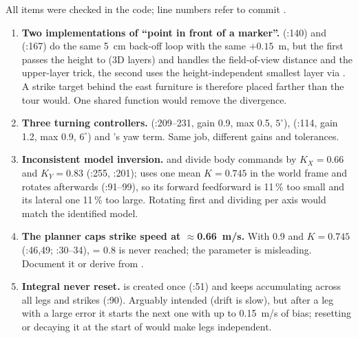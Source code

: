 \begin{review}
All items were checked in the code; line numbers refer to commit .
\begin{enumerate}[leftmargin=*]
  \item \textbf{Two implementations of ``point in front of a marker''.} 
        (:140) and  (:167) do the same
        5~cm back-off loop with the same $+0.15$~m, but the first passes the height to  (3D
        layers) and handles the field-of-view distance and the upper-layer trick, the second uses the
        height-independent smallest layer via . A strike target behind the east furniture is
        therefore placed farther than the tour would. One shared function would remove the divergence.
  \item \textbf{Three turning controllers.}  (:209--231,
        gain 0.9, max 0.5, $5^\circ$),  (:114, gain 1.2, max 0.9, $6^\circ$)
        and 's yaw term. Same job, different gains and tolerances.
  \item \textbf{Inconsistent model inversion.}  and  divide body commands by
        $K_X = 0.66$ and $K_Y = 0.83$ (:255, :201); 
        uses one mean $K = 0.745$ in the world frame and rotates afterwards (:91--99), so its
        forward feedforward is 11\,\% too small and its lateral one 11\,\% too large. Rotating first and dividing
        per axis would match the identified model.
  \item \textbf{The planner caps strike speed at $\approx$0.66~m/s.} With  0.9 and $K = 0.745$
        (:46,49; :30--34),  = 0.8 is never reached; the
        parameter is misleading. Document it or derive  from .
  \item \textbf{Integral never reset.}  is created once (:51) and keeps
        accumulating across all legs and strikes (:90). Arguably intended (drift is slow), but
        after a leg with a large error it starts the next one with up to 0.15~m/s of bias; resetting or decaying
        it at the start of  would make legs independent.

\end{enumerate}
\end{review}
